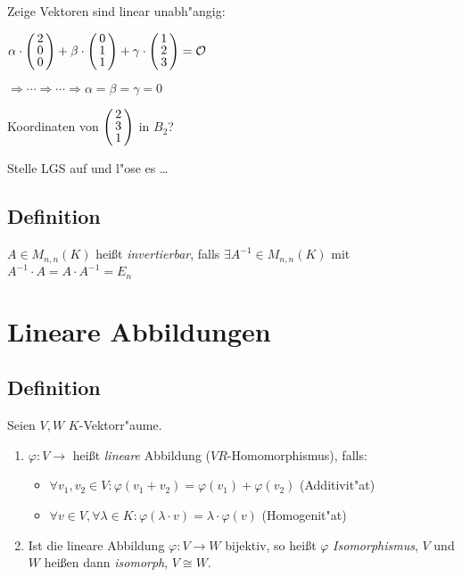 \begin{enumerate}
	 Zeige Vektoren sind linear unabh"angig:
	 
	 $\alpha \cdot \vct{2 \\ 0 \\ 0} + \beta \cdot \vct{0 \\  1\\ 1} + \gamma \cdot \vct{1 \\ 2 \\ 3} = \zerovec$
	 
	 $\Rightarrow  \cdots  \Rightarrow \cdots \Rightarrow \alpha = \beta = \gamma = 0$
	 
	 Koordinaten von $\vct{2 \\ 3 \\ 1}$ in $B_2$?
	 
	 Stelle LGS auf und l"ose es \dots
	 \end{enumerate}
	 \subsection{Definition}
	 
	 $A \in M_{n,n}(K)$ heißt \emph{invertierbar}, falls $\exists  A^{-1} \in M_{n,n}(K)$ mit $A^{-1} \cdot A = A \cdot A^{-1} = E_n$
	 
\section{Lineare Abbildungen}
\subsection{Definition}

Seien $V,W$ $K$-Vektorr"aume.
\begin{enumerate}
	\item
	$\varphi: V \rightarrow$ heißt \emph{lineare} Abbildung ($VR$-Homomorphismus), falls:
	\begin{itemize}
		\item
		$\forall v_1, v_2 \in V: \varphi(v_1+v_2) = \varphi(v_1) + \varphi(v_2)$ (Additivit"at)
		\item
		$\forall v \in V, \forall \lambda \in K: \varphi(\lambda \cdot v) = \lambda \cdot \varphi(v)$ (Homogenit"at)
	\end{itemize}
	\item
	Ist die lineare Abbildung $\varphi: V \rightarrow W$ bijektiv, so heißt $\varphi$ \emph{Isomorphismus}, $V$ und $W$ heißen dann \emph{isomorph}, $V \cong W$.
\end{enumerate}
